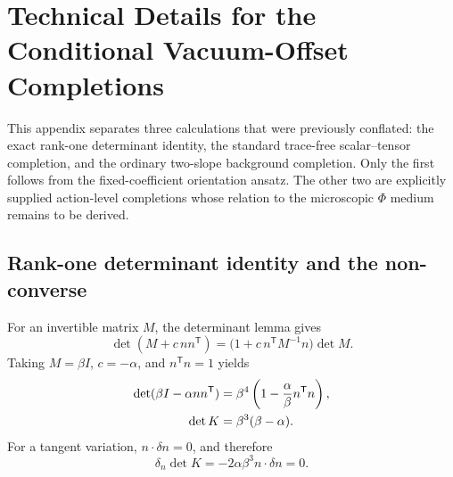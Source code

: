 
\section{Technical Details for the Conditional Vacuum-Offset Completions}
\label{app:cc_technical}

This appendix separates three calculations that were previously conflated:
the exact rank-one determinant identity, the standard trace-free
scalar--tensor completion, and the ordinary two-slope background completion.
Only the first follows from the fixed-coefficient orientation ansatz.  The
other two are explicitly supplied action-level completions whose relation to
the microscopic $\Phi$ medium remains to be derived.

\subsection{Rank-one determinant identity and the non-converse}
\label{app:rank1}

For an invertible matrix $M$, the determinant lemma gives
\begin{equation}
 \det(M+c\,nn^{\mathsf T})
 =\bigl(1+c\,n^{\mathsf T}M^{-1}n\bigr)\det M.
 \label{eq:matrix_det_lemma}
\end{equation}
Taking $M=\beta I$, $c=-\alpha$, and $n^{\mathsf T}n=1$ yields
\begin{align}
 \det(\beta I-\alpha nn^{\mathsf T})
 &=\beta^4\left(1-{\alpha\over\beta}n^{\mathsf T}n\right),
 \label{eq:K_det_general_app}\\
 \det K&=\beta^3(\beta-\alpha).
 \label{eq:detK_app}
\end{align}
For a tangent variation, $n\cdot\delta n=0$, and therefore
\begin{equation}
 \delta_n\det K=-2\alpha\beta^3n\cdot\delta n=0.
 \label{eq:detK_tangent_app}
\end{equation}


